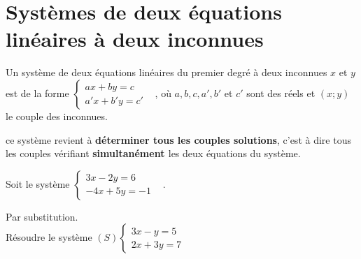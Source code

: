 \section{Systèmes de deux équations linéaires à deux inconnues}

\begin{Définition}
Un système de deux équations linéaires du premier degré à deux inconnues $x$ et $y$ est de la forme $\left\{
    \begin{array}{ll}
     ax+by=c    & \\
       a'x+b'y=c' & 
    \end{array}
\right.$, où $a,b,c,a',b'$ et $c'$ sont des réels et $(x;y)$ le couple des inconnues.

\end{Définition}

\begin{Remarque}
 ce système revient à {\bf{déterminer tous les couples solutions}}, c'est à dire tous les couples vérifiant {\bf{simultanément }} les deux équations du système. 
\end{Remarque}

\begin{Exemple}
Soit le système $\left\{
    \begin{array}{ll}
     3x-2y=6    & \\
       -4x+5y=-1 & 
    \end{array}
\right.$.
\vspace{0.3cm}

\ligne

\end{Exemple}

\begin{Méthode}Par substitution. \\
Résoudre le système 
$(S)\left\{
    \begin{array}{ll}
     3x-y=5    & \\
       2x+3y=7 & 
    \end{array}
\right.$

\vspace{0.3cm}

\ligne

\ligne

\ligne

\ligne

\ligne

\ligne

\ligne

\ligne

\ligne

\ligne

\end{Méthode}


